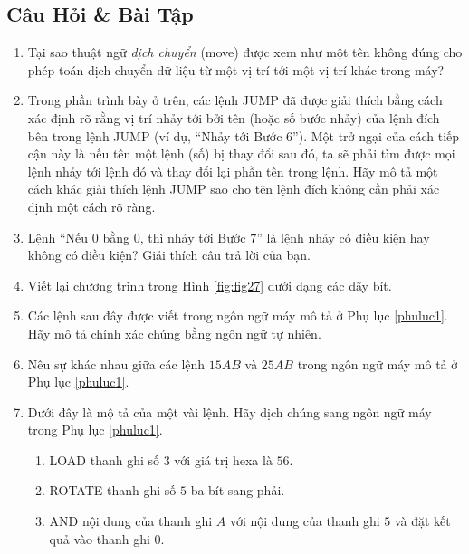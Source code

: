 \subsection*{Câu Hỏi \& Bài Tập}
\begin{enumerate}
\item Tại sao thuật ngữ \textit{dịch chuyển} (move) được xem như một tên không đúng cho
  phép toán dịch chuyển dữ liệu từ một vị trí tới một vị trí khác trong máy?

\item Trong phần trình bày ở trên, các lệnh JUMP đã được giải thích bằng cách xác định rõ
  rằng vị trí nhảy tới bởi tên (hoặc số bước nhảy) của lệnh đích bên trong lệnh JUMP (ví
  dụ, ``Nhảy tới Bước 6''). Một trở ngại của cách tiếp cận này là nếu tên một lệnh (số) bị
  thay đổi sau đó, ta sẽ phải tìm được mọi lệnh nhảy tới lệnh đó và thay đổi lại phần tên
  trong lệnh. Hãy mô tả một cách khác giải thích lệnh JUMP sao cho tên lệnh đích không cần
  phải xác định một cách rõ ràng.

\item Lệnh ``Nếu $0$ bằng $0$, thì nhảy tới Bước $7$'' là lệnh nhảy có điều kiện hay không
  có điều kiện? Giải thích câu trả lời của bạn.

\item Viết lại chương trình trong Hình \ref{fig:fig27} dưới dạng các dãy bít.

\item Các lệnh sau đây được viết trong ngôn ngữ máy mô tả ở Phụ lục \ref{phuluc1}. Hãy mô
  tả chính xác chúng bằng ngôn ngữ tự nhiên.


\item Nêu sự khác nhau giữa các lệnh $15AB$ và $25AB$ trong ngôn ngữ máy mô tả ở Phụ lục
  \ref{phuluc1}.

\item Dưới đây là mộ tả của một vài lệnh. Hãy dịch chúng sang ngôn ngữ máy trong Phụ lục
  \ref{phuluc1}.
  \begin{enumerate}
  \item LOAD thanh ghi số $3$ với giá trị hexa là $56$.

  \item ROTATE thanh ghi số $5$ ba bít sang phải.

  \item AND nội dung của thanh ghi $A$ với nội dung của thanh ghi $5$ và đặt kết quả vào
    thanh ghi $0$.
  \end{enumerate}
\end{enumerate}

